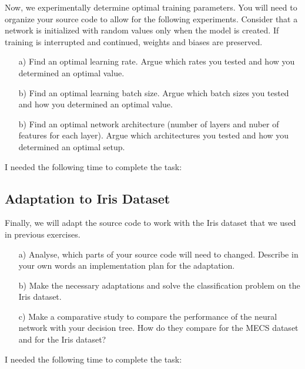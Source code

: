 \documentclass{article}
\begin{document}
Now, we experimentally determine optimal training parameters. You will need to organize your source code to allow for the following experiments. Consider that a network is initialized with random values only when the model is created. If training is interrupted and continued, weights and biases are preserved.

\begin{enumerate}

\item[a)] Find an optimal learning rate. Argue which rates you tested and how you determined an optimal value.

\item[b)] Find an optimal learning batch size. Argue which batch sizes you tested and how you determined an optimal value.

\item[b)] Find an optimal network architecture (number of layers and nuber of features for each layer). Argue which architectures you tested and how you determined an optimal setup.

\end{enumerate}

I needed the following time to complete the task:

\subsection{Adaptation to Iris Dataset}

Finally, we will adapt the source code to work with the Iris dataset that we used in previous exercises. 

\begin{enumerate}

\item[a)] Analyse, which parts of your source code will need to changed. Describe in your own words an implementation plan for the adaptation.

\item[b)] Make the necessary adaptations and solve the classification problem on the Iris dataset.

\item[c)] Make a comparative study to compare the performance of the neural network with your decision tree. How do they compare for the MECS dataset and for the Iris dataset?

\end{enumerate}

I needed the following time to complete the task:
\end{document}
